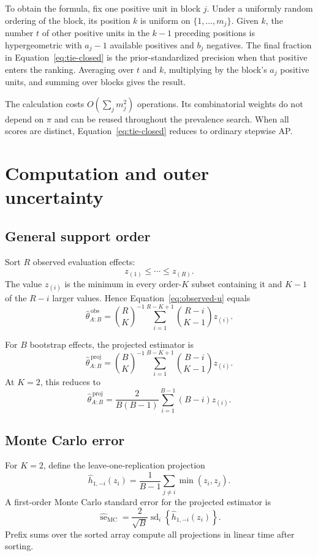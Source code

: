 \documentclass[11pt]{article}
\theoremstyle{remark}
\begin{document}
To obtain the formula, fix one positive unit in block $j$. Under a uniformly random ordering of the block, its position $k$ is uniform on $\{1,\ldots,m_j\}$. Given $k$, the number $t$ of other positive units in the $k-1$ preceding positions is hypergeometric with $a_j-1$ available positives and $b_j$ negatives. The final fraction in Equation~\eqref{eq:tie-closed} is the prior-standardized precision when that positive enters the ranking. Averaging over $t$ and $k$, multiplying by the block's $a_j$ positive units, and summing over blocks gives the result.

The calculation costs $O(\sum_jm_j^2)$ operations. Its combinatorial weights do not depend on $\pi$ and can be reused throughout the prevalence search. When all scores are distinct, Equation~\eqref{eq:tie-closed} reduces to ordinary stepwise AP.

\section{Computation and outer uncertainty}
\label{app:computation}

\subsection{General support order}

Sort $R$ observed evaluation effects:
\[
z_{(1)}\leq\cdots\leq z_{(R)}.
\]
The value $z_{(i)}$ is the minimum in every order-$K$ subset containing it and $K-1$ of the $R-i$ larger values. Hence Equation~\eqref{eq:observed-u} equals
\begin{equation}
\widehat\theta_{A:B}^{\,\mathrm{obs}}
=
\binom RK^{-1}
\sum_{i=1}^{R-K+1}
\binom{R-i}{K-1}z_{(i)}.
\label{eq:sorted-observed}
\end{equation}

For $B$ bootstrap effects, the projected estimator is
\begin{equation}
\widehat\theta_{A:B}^{\,\mathrm{proj}}
=
\binom BK^{-1}
\sum_{i=1}^{B-K+1}
\binom{B-i}{K-1}z_{(i)}.
\label{eq:sorted-bootstrap}
\end{equation}
At $K=2$, this reduces to
\[
\widehat\theta_{A:B}^{\,\mathrm{proj}}
=
\frac{2}{B(B-1)}
\sum_{i=1}^{B-1}(B-i)z_{(i)}.
\]

\subsection{Monte Carlo error}

For $K=2$, define the leave-one-replication projection
\[
\widehat h_{1,-i}(z_i)
=
\frac1{B-1}\sum_{j\ne i}\min(z_i,z_j).
\]
A first-order Monte Carlo standard error for the projected estimator is
\begin{equation}
\widehat{\operatorname{se}}_{\mathrm{MC}}
=
\frac2{\sqrt B}
\operatorname{sd}_{i}
\left\{
\widehat h_{1,-i}(z_i)
\right\}.
\label{eq:mcse}
\end{equation}
Prefix sums over the sorted array compute all projections in linear time after sorting.
\end{document}
